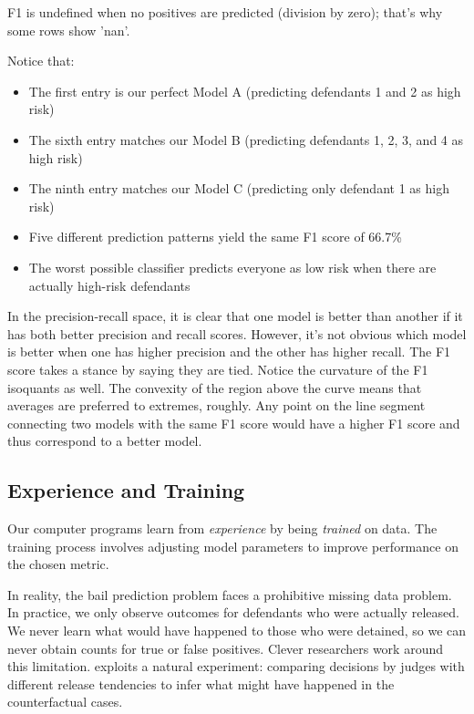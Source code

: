 F1 is undefined when no positives are predicted (division by zero); that's why some rows show 'nan'.

Notice that:
\begin{itemize}
\item The first entry is our perfect Model A (predicting defendants 1 and 2 as high risk)
\item The sixth entry matches our Model B (predicting defendants 1, 2, 3, and 4 as high risk)
\item The ninth entry matches our Model C (predicting only defendant 1 as high risk)
\item Five different prediction patterns yield the same F1 score of 66.7\%
\item The worst possible classifier predicts everyone as low risk when there are actually high-risk defendants
\end{itemize}

In the precision-recall space, it is clear that one model is better than another if it has both better precision and recall scores. However, it's not obvious which model is better when one has higher precision and the other has higher recall. The F1 score takes a stance by saying they are tied. Notice the curvature of the F1 isoquants as well. The convexity of the region above the curve means that averages are preferred to extremes, roughly. Any point on the line segment connecting two models with the same F1 score would have a higher F1 score and thus correspond to a better model.

\subsection{Experience and Training}

Our computer programs learn from \textit{experience} by being \textit{trained} on data. The training process involves adjusting model parameters to improve performance on the chosen metric.

In reality, the bail prediction problem faces a prohibitive missing data problem. In practice, we only observe outcomes for defendants who were actually released. We never learn what would have happened to those who were detained, so we can never obtain counts for true or false positives. Clever researchers work around this limitation. \cite{kleinberg2018human} exploits a natural experiment: comparing decisions by judges with different release tendencies to infer what might have happened in the counterfactual cases.

